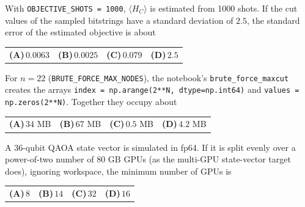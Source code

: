 \documentclass[11pt,a4paper]{article}
\newcommand{\optlabel}[1]{\textbf{(#1)}}
\newenvironment{qitem}[1]{\begin{list}{}{\setlength{\leftmargin}{3.3em}\setlength{\labelwidth}{3.1em}%
  \setlength{\labelsep}{0.2em}\setlength{\topsep}{3pt}\setlength{\parsep}{3pt}}\item[\textbf{Q.#1}\hfill]}{\end{list}}
\newcommand{\qsep}{\par\vspace{2pt}{\color{black!15}\hrule}\vspace{4pt}}
\begin{document}
\begin{qitem}{65}
With \texttt{OBJECTIVE\_SHOTS = 1000}, $\langle H_C\rangle$ is estimated from 1000 shots. If the cut values of the sampled
bitstrings have a standard deviation of $2.5$, the standard error of the estimated objective is about
\par\smallskip\noindent\begin{tabularx}{\linewidth}{@{}*{4}{L}@{}}
\optlabel{A}\,$0.0063$ & \optlabel{B}\,$0.0025$ & \optlabel{C}\,$0.079$ & \optlabel{D}\,$2.5$
\end{tabularx}
\end{qitem}
\qsep

\begin{qitem}{66}
For $n = 22$ (\texttt{BRUTE\_FORCE\_MAX\_NODES}), the notebook's \texttt{brute\_force\_maxcut} creates the arrays
\texttt{index = np.arange(2**N, dtype=np.int64)} and \texttt{values = np.zeros(2**N)}. Together they occupy about
\par\smallskip\noindent\begin{tabularx}{\linewidth}{@{}*{4}{L}@{}}
\optlabel{A}\,$34$ MB & \optlabel{B}\,$67$ MB & \optlabel{C}\,$0.5$ MB & \optlabel{D}\,$4.2$ MB
\end{tabularx}
\end{qitem}
\qsep

\begin{qitem}{67}
A 36-qubit QAOA state vector is simulated in fp64. If it is split evenly over a power-of-two number of 80 GB GPUs (as the
multi-GPU state-vector target does), ignoring workspace, the minimum number of GPUs is
\par\smallskip\noindent\begin{tabularx}{\linewidth}{@{}*{4}{L}@{}}
\optlabel{A}\,$8$ & \optlabel{B}\,$14$ & \optlabel{C}\,$32$ & \optlabel{D}\,$16$
\end{tabularx}
\end{qitem}
\qsep
\end{document}
